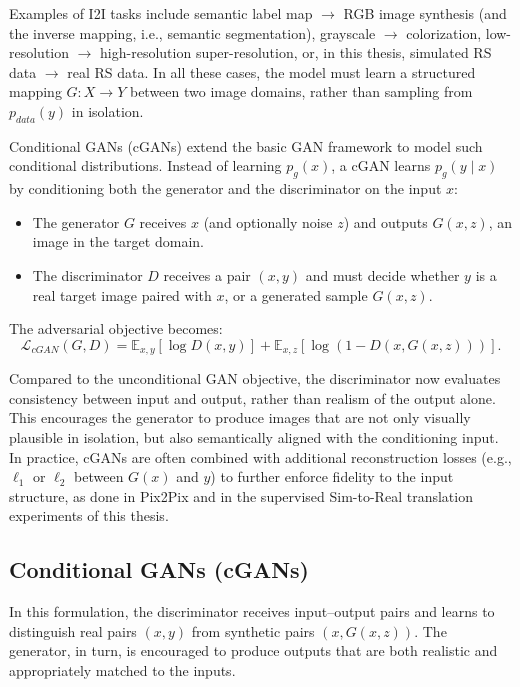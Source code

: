 Examples of I2I tasks include semantic label map $\rightarrow$ RGB image synthesis (and the inverse mapping, i.e., semantic segmentation), grayscale $\rightarrow$ colorization, low-resolution $\rightarrow$ high-resolution super-resolution, or, in this thesis, simulated RS data $\rightarrow$ real RS data.
In all these cases, the model must learn a structured mapping $G: X \to Y$ between two image domains, rather than sampling from $p_{data}(y)$ in isolation.

Conditional GANs (cGANs) extend the basic GAN framework to model such conditional distributions.
Instead of learning $p_g(x)$, a cGAN learns $p_g(y \mid x)$ by conditioning both the generator and the discriminator on the input $x$:
\begin{itemize}
    \item The generator $G$ receives $x$ (and optionally noise $z$) and outputs $G(x, z)$, an image in the target domain.
    \item The discriminator $D$ receives a pair $(x, y)$ and must decide whether $y$ is a real target image paired with $x$, or a generated sample $G(x, z)$.
\end{itemize}
The adversarial objective becomes:
\begin{equation}\label{eq:cgan_objective}
\mathcal{L}_{cGAN}(G, D) = \mathbb{E}_{x,y}[\log D(x, y)] + \mathbb{E}_{x,z}[\log (1 - D(x, G(x, z)))].
\end{equation}

Compared to the unconditional GAN objective, the discriminator now evaluates consistency between input and output, rather than realism of the output alone.
This encourages the generator to produce images that are not only visually plausible in isolation, but also semantically aligned with the conditioning input.
In practice, cGANs are often combined with additional reconstruction losses (e.g., $\ell_1$ or $\ell_2$ between $G(x)$ and $y$) to further enforce fidelity to the input structure, as done in Pix2Pix and in the supervised Sim-to-Real translation experiments of this thesis.

\subsection{Conditional GANs (cGANs)}
\label{subsec:c_gan}


In this formulation, the discriminator receives input–output pairs and learns to distinguish real pairs $(x, y)$ from synthetic pairs $(x, G(x, z))$.
The generator, in turn, is encouraged to produce outputs that are both realistic and appropriately matched to the inputs.

